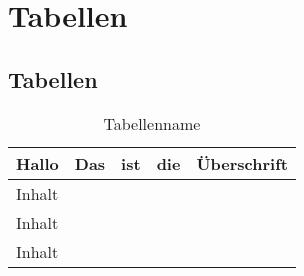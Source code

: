 \section{Tabellen}

\subsection{Tabellen}
\begin{table}[h]
\begin{tabular}{l|l|l|l|l}
Hallo  & Das & ist & die & Überschrift \\ \hline
Inhalt &     &     &     &             \\
Inhalt &     &     &     &             \\
Inhalt &     &     &     &            
\end{tabular}
\caption{Tabellenname}
\end{table}

